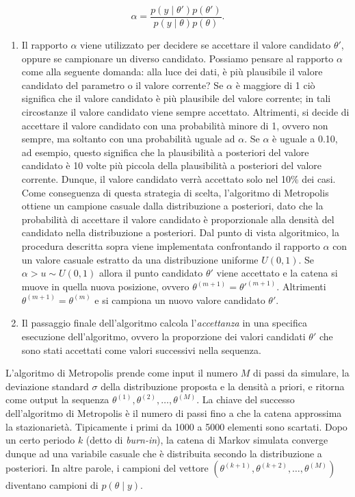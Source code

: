 \documentclass[
]{memoir}
\begin{document}
\begin{equation}
\alpha = \frac{p(y \mid \theta') p(\theta')}{p(y \mid \theta) p(\theta)}.
\label{eq:ratio-metropolis}
\end{equation}

\begin{enumerate}
\def\labelenumi{(\alph{enumi})}
\setcounter{enumi}{3}
\item
  Il rapporto \(\alpha\) viene utilizzato per decidere se accettare il valore candidato \(\theta'\), oppure se campionare un diverso candidato. Possiamo pensare al rapporto \(\alpha\) come alla seguente domanda: alla luce dei dati, è più plausibile il valore candidato del parametro o il valore corrente? Se \(\alpha\) è maggiore di 1 ciò significa che il valore candidato è più plausibile del valore corrente; in tali circostanze il valore candidato viene sempre accettato. Altrimenti, si decide di accettare il valore candidato con una probabilità minore di 1, ovvero non sempre, ma soltanto con una probabilità uguale ad \(\alpha\). Se \(\alpha\) è uguale a 0.10, ad esempio, questo significa che la plausibilità a posteriori del valore candidato è 10 volte più piccola della plausibilità a posteriori del valore corrente. Dunque, il valore candidato verrà accettato solo nel 10\% dei casi. Come conseguenza di questa strategia di scelta, l'algoritmo di Metropolis ottiene un campione casuale dalla distribuzione a posteriori, dato che la probabilità di accettare il valore candidato è proporzionale alla densità del candidato nella distribuzione a posteriori. Dal punto di vista algoritmico, la procedura descritta sopra viene implementata confrontando il rapporto \(\alpha\) con un valore casuale estratto da una distribuzione uniforme \(U(0, 1)\). Se \(\alpha > u \sim U(0, 1)\) allora il punto candidato \(\theta'\) viene accettato e la catena si muove in quella nuova posizione, ovvero \(\theta^{(m+1)} = \theta'^{(m+1)}\). Altrimenti \(\theta^{(m+1)} = \theta^{(m)}\) e si campiona un nuovo valore candidato \(\theta'\).
\item
  Il passaggio finale dell'algoritmo calcola l'\emph{accettanza} in una specifica esecuzione dell'algoritmo, ovvero la proporzione dei valori candidati \(\theta'\) che sono stati accettati come valori successivi nella sequenza.
\end{enumerate}

L'algoritmo di Metropolis prende come input il numero \(M\) di passi da simulare, la deviazione standard \(\sigma\) della distribuzione proposta e la densità a priori, e ritorna come output la sequenza \(\theta^{(1)}, \theta^{(2)}, \dots, \theta^{(M)}\). La chiave del successo dell'algoritmo di Metropolis è il numero di passi fino a che la catena approssima la stazionarietà. Tipicamente i primi da 1000 a 5000 elementi sono scartati. Dopo un certo periodo \(k\) (detto di \emph{burn-in}), la catena di Markov simulata converge dunque ad una variabile casuale che è distribuita secondo la distribuzione a posteriori. In altre parole, i campioni del vettore \((\theta^{(k+1)}, \theta^{(k+2)}, \dots, \theta^{(M)})\) diventano campioni di \(p(\theta \mid y)\).
\end{document}
